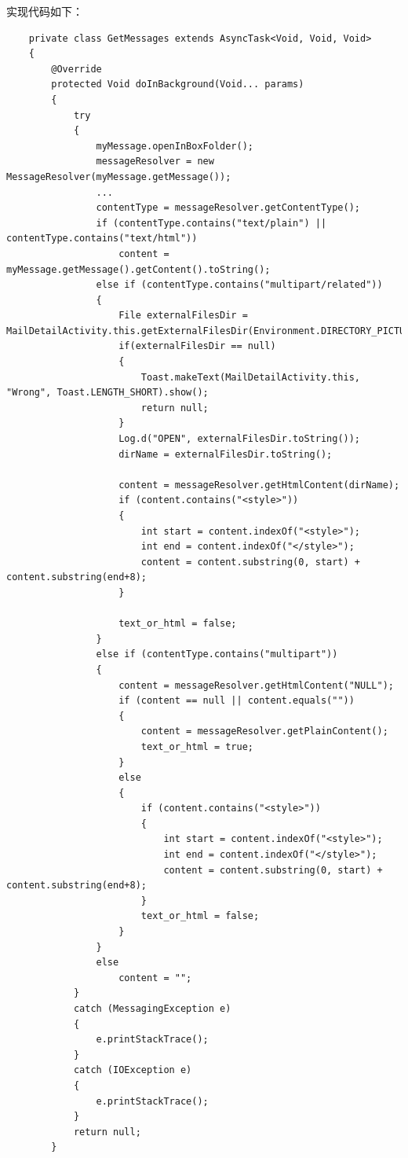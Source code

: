 \documentclass[a4paper,left=2.5cm,right=2.5cm,11pt]{article}
\begin{document}
	实现代码如下：
	\begin{lstlisting}
	private class GetMessages extends AsyncTask<Void, Void, Void>
    {
        @Override
        protected Void doInBackground(Void... params)
        {
            try
            {
                myMessage.openInBoxFolder();
                messageResolver = new MessageResolver(myMessage.getMessage());
                ...
                contentType = messageResolver.getContentType();
                if (contentType.contains("text/plain") || contentType.contains("text/html"))
                    content = myMessage.getMessage().getContent().toString();
                else if (contentType.contains("multipart/related"))
                {
                    File externalFilesDir = MailDetailActivity.this.getExternalFilesDir(Environment.DIRECTORY_PICTURES);
                    if(externalFilesDir == null)
                    {
                        Toast.makeText(MailDetailActivity.this, "Wrong", Toast.LENGTH_SHORT).show();
                        return null;
                    }
                    Log.d("OPEN", externalFilesDir.toString());
                    dirName = externalFilesDir.toString();

                    content = messageResolver.getHtmlContent(dirName);
                    if (content.contains("<style>"))
                    {
                        int start = content.indexOf("<style>");
                        int end = content.indexOf("</style>");
                        content = content.substring(0, start) + content.substring(end+8);
                    }

                    text_or_html = false;
                }
                else if (contentType.contains("multipart"))
                {
                    content = messageResolver.getHtmlContent("NULL");
                    if (content == null || content.equals(""))
                    {
                        content = messageResolver.getPlainContent();
                        text_or_html = true;
                    }
                    else
                    {
                        if (content.contains("<style>"))
                        {
                            int start = content.indexOf("<style>");
                            int end = content.indexOf("</style>");
                            content = content.substring(0, start) + content.substring(end+8);
                        }
                        text_or_html = false;
                    }
                }
                else
                    content = "";
            }
            catch (MessagingException e)
            {
                e.printStackTrace();
            }
            catch (IOException e)
            {
                e.printStackTrace();
            }
            return null;
        }


\end{lstlisting}
\end{document}
